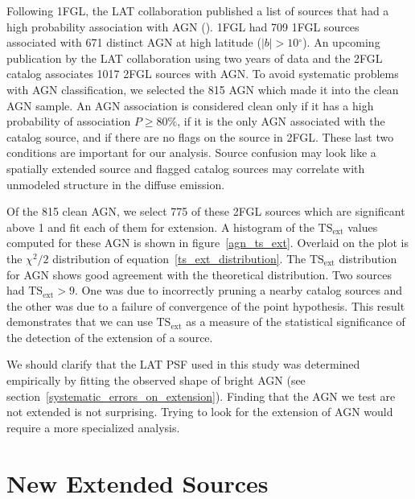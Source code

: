\documentclass[12pt,preprint]{aastex}
\newcommand{\gev}{\text{GeV}\xspace}
\newcommand{\tsext}{{\ensuremath{\text{TS}_{\text{ext}}}}\xspace}
\renewcommand{\deg}{\ensuremath{^\circ}\xspace}
\begin{document}
Following 1FGL, the LAT collaboration published a list of sources that
had a high probability association with AGN (\cite{first_agn_cat}).
1FGL had 709 1FGL sources associated with 671 distinct AGN at high
latitude ($|b|>10\deg$).  An upcoming publication by the LAT collaboration
using two years of data and the 2FGL catalog associates 1017 2FGL sources
with AGN.  To avoid systematic problems with AGN classification, we
selected the 815 AGN which made it into the clean AGN sample.  An AGN
association is considered clean only if it has a high probability
of association $P\ge 80\%$, if it is the only AGN associated with the
catalog source, and if there are no flags on the source in 2FGL. These
last two conditions are important for our analysis. Source
confusion may look like a spatially extended source and flagged catalog
sources may correlate with unmodeled structure in the diffuse emission.

Of the 815 clean AGN, we select 775 of these 2FGL sources which
are significant above 1 \gev and fit each of them for extension.
A histogram of the \tsext values computed for these AGN is shown in
figure~\ref{agn_ts_ext}. Overlaid on the plot is the $\chi^2/2$
distribution of equation~\ref{ts_ext_distribution}.
The \tsext distribution for AGN shows good
agreement with the theoretical distribution.  Two sources had $\tsext>9$.
One was due to incorrectly pruning a nearby catalog sources and the
other was due to a failure of convergence of the point hypothesis.
This result demonstrates that we can use \tsext as a measure of the
statistical significance of the detection of the extension of a source.

We should clarify that the LAT PSF used in this study was determined
empirically by fitting the observed shape of bright AGN (see
section~\ref{systematic_errors_on_extension}). Finding that the AGN we
test are not extended is not surprising. Trying to look for the extension
of AGN would require a more specialized analysis.

\section{New Extended Sources}
\label{new_ext_srcs_section}

\end{document}
